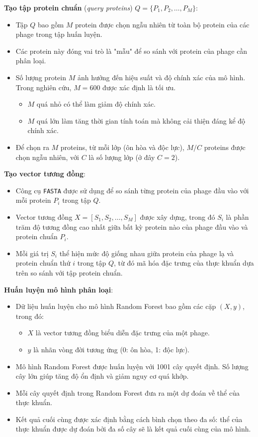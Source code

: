 \textbf{Tạo tập protein chuẩn} (\textit{query proteins}) $Q = \{P_1, P_2, \dots, P_M\}$:
    \begin{itemize}
        \item Tập $Q$ bao gồm $M$ protein được chọn ngẫu nhiên từ toàn bộ protein của các phage trong tập huấn luyện. 
        \item Các protein này đóng vai trò là "mẫu" để so sánh với protein của phage cần phân loại.
        \item Số lượng protein $M$ ảnh hưởng đến hiệu suất và độ chính xác của mô hình. Trong nghiên cứu, $M = 600$ được xác định là tối ưu. 
            \begin{itemize}
                \item $M$ quá nhỏ có thể làm giảm độ chính xác. 
                \item $M$ quá lớn làm tăng thời gian tính toán mà không cải thiện đáng kể độ chính xác.
            \end{itemize}
        \item Để chọn ra $M$ proteins, từ mỗi lớp (ôn hòa và độc lực), $M/C$ proteins được chọn ngẫu nhiên, với $C$ là số lượng lớp (ở đây $C = 2$). 
    \end{itemize}
    
\textbf{Tạo vector tương đồng}:
    \begin{itemize}
        \item Công cụ \texttt{FASTA} được sử dụng để so sánh từng protein của phage đầu vào với mỗi protein $P_i$ trong tập $Q$. 
        \item Vector tương đồng $X = [S_1, S_2, \dots, S_M]$ được xây dựng, trong đó $S_i$ là phần trăm độ tương đồng cao nhất giữa bất kỳ protein nào của phage đầu vào và protein chuẩn $P_i$. 
        \item Mỗi giá trị $S_i$ thể hiện mức độ giống nhau giữa protein của phage lạ và protein chuẩn thứ $i$ trong tập $Q$, từ đó mã hóa đặc trưng của thực khuẩn dựa trên so sánh với tập protein chuẩn.
    \end{itemize}
    
\textbf{Huấn luyện mô hình phân loại}:
    \begin{itemize}
        \item Dữ liệu huấn luyện cho mô hình Random Forest bao gồm các cặp $(X, y)$, trong đó:
            \begin{itemize}
                \item $X$ là vector tương đồng biểu diễn đặc trưng của một phage.
                \item $y$ là nhãn vòng đời tương ứng (0: ôn hòa, 1: độc lực).
            \end{itemize}
         \item Mô hình Random Forest được huấn luyện với 1001 cây quyết định. Số lượng cây lớn giúp tăng độ ổn định và giảm nguy cơ quá khớp. 
         \item Mỗi cây quyết định trong Random Forest đưa ra một dự đoán về thể của thực khuẩn. 
         \item Kết quả cuối cùng được xác định bằng cách bình chọn theo đa số: thể của thực khuẩn được dự đoán bởi đa số cây sẽ là kết quả cuối cùng của mô hình. 
    \end{itemize}


